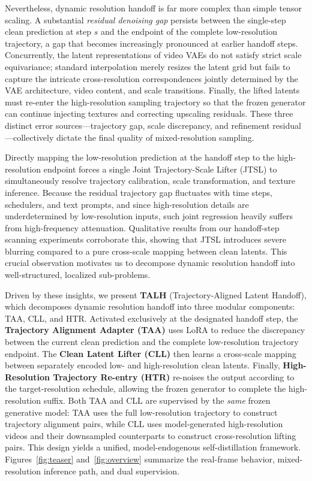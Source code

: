 Nevertheless, dynamic resolution handoff is far more complex than simple
tensor scaling. A substantial \emph{residual denoising gap} persists
between the single-step clean prediction at step \(s\) and the endpoint
of the complete low-resolution trajectory, a gap that becomes
increasingly pronounced at earlier handoff steps. Concurrently, the
latent representations of video VAEs do not satisfy strict scale
equivariance; standard interpolation merely resizes the latent grid but
fails to capture the intricate cross-resolution correspondences jointly
determined by the VAE architecture, video content, and scale
transitions. Finally, the lifted latents must re-enter the
high-resolution sampling trajectory so that the frozen generator can
continue injecting textures and correcting upscaling residuals. These
three distinct error sources---trajectory gap, scale discrepancy, and
refinement residual---collectively dictate the final quality of
mixed-resolution sampling.

Directly mapping the low-resolution prediction at the handoff step to
the high-resolution endpoint forces a single Joint Trajectory-Scale
Lifter (JTSL) to simultaneously resolve trajectory calibration, scale
transformation, and texture inference. Because the residual trajectory
gap fluctuates with time steps, schedulers, and text prompts, and since
high-resolution details are underdetermined by low-resolution inputs,
such joint regression heavily suffers from high-frequency attenuation.
Qualitative results from our handoff-step scanning experiments
corroborate this, showing that JTSL introduces severe blurring compared
to a pure cross-scale mapping between clean latents. This crucial
observation motivates us to decompose dynamic resolution handoff into
well-structured, localized sub-problems.

Driven by these insights, we present \textbf{TALH} (Trajectory-Aligned
Latent Handoff), which decomposes dynamic resolution handoff into three
modular components: TAA, CLL, and HTR. Activated exclusively at the
designated handoff step, the \textbf{Trajectory Alignment Adapter (TAA)}
uses LoRA to reduce the discrepancy between the current clean prediction
and the complete low-resolution trajectory endpoint. The \textbf{Clean
Latent Lifter (CLL)} then learns a cross-scale mapping between
separately encoded low- and high-resolution clean latents. Finally,
\textbf{High-Resolution Trajectory Re-entry (HTR)} re-noises the output
according to the target-resolution schedule, allowing the frozen
generator to complete the high-resolution suffix. Both TAA and CLL are
supervised by the \emph{same} frozen generative model: TAA uses the full
low-resolution trajectory to construct trajectory alignment pairs, while
CLL uses model-generated high-resolution videos and their downsampled
counterparts to construct cross-resolution lifting pairs. This design
yields a unified, model-endogenous self-distillation framework.
Figures~\ref{fig:teaser} and~\ref{fig:overview} summarize the real-frame
behavior, mixed-resolution inference path, and dual supervision.

